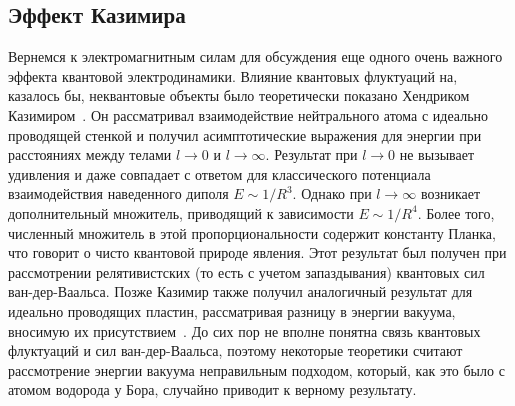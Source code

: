 \documentclass[a4paper, 12pt]{article}
\begin{document}
\subsection{Эффект Казимира}

Вернемся к электромагнитным силам для обсуждения еще одного очень важного эффекта квантовой электродинамики. 
Влияние квантовых флуктуаций на, казалось бы, неквантовые объекты было теоретически показано Хендриком Казимиром~\cite{Casimir.van-der-Waals}. 
Он рассматривал взаимодействие нейтрального атома с идеально проводящей стенкой и получил асимптотические выражения для энергии при расстояниях между телами $l\to0$ и $l\to\infty$. 
Результат при $l\to0$ не вызывает удивления и даже совпадает с ответом для классического потенциала взаимодействия наведенного диполя $E \sim 1/R^3$. 
Однако при $l\to\infty$ возникает дополнительный множитель, приводящий к зависимости $E \sim 1/R^4$. 
Более того, численный множитель в этой пропорциональности содержит константу Планка, что говорит о чисто квантовой природе явления. 
Этот результат был получен при рассмотрении релятивистских (то есть с учетом запаздывания) квантовых сил ван-дер-Ваальса. 
Позже Казимир также получил аналогичный результат для идеально проводящих пластин, рассматривая разницу в энергии вакуума, вносимую их присутствием~\cite{Casimir.vacuum}. 
До сих пор не вполне понятна связь квантовых флуктуаций и сил ван-дер-Ваальса, поэтому некоторые теоретики считают рассмотрение энергии вакуума неправильным подходом, который, как это было с атомом водорода у Бора, случайно приводит к верному результату. 
\end{document}
